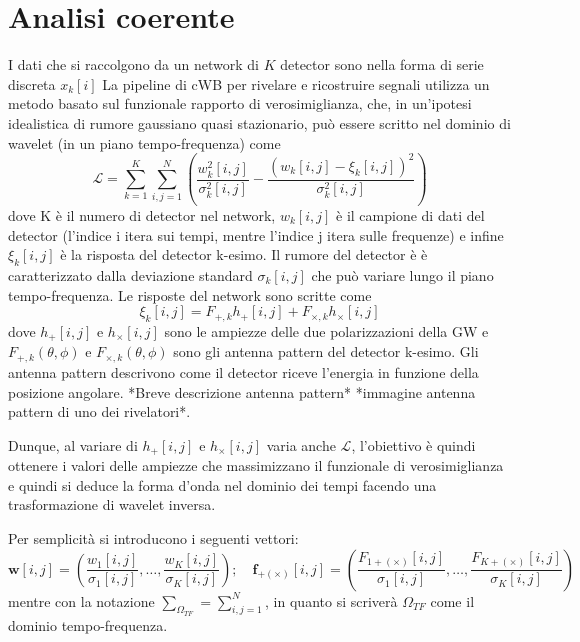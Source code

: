 \section{Analisi coerente}
\label{section:coherent_analysis}
I dati che si raccolgono da un network di $K$ detector sono nella forma di serie discreta $x_k[i]$
La pipeline di cWB per rivelare e ricostruire segnali utilizza un metodo basato sul funzionale rapporto di verosimiglianza, che, in un'ipotesi idealistica di rumore gaussiano quasi stazionario, può essere scritto nel dominio di wavelet (in un piano tempo-frequenza) come
\begin{equation}
	\mathcal{L} = \sum_{k=1}^{K}\sum_{i,j=1}^{N}\left(\frac{w_k^2[i,j]}{\sigma_k^2[i,j]} - \frac{(w_k[i,j]-\xi_k[i,j])^2}{\sigma_k^2[i,j]}  \right)
	\label{eqn:Likelihood}
\end{equation}
dove K è il numero di detector nel network, $w_k[i,j]$ è il campione di dati del detector (l'indice i itera sui tempi, mentre l'indice j itera sulle frequenze) e infine $\xi_k[i,j]$ è la risposta del detector k-esimo.
Il rumore del detector è è caratterizzato dalla deviazione standard $\sigma_k[i,j]$ che può variare lungo il piano tempo-frequenza.
Le risposte del network sono scritte come
\begin{equation}
	\xi_k[i,j] = F_{+,k}h_+[i,j] + F_{\times,k}h_\times[i,j]
	\label{eqn:detector_response}
\end{equation}
dove $h_{+}[i,j]$ e $h_{\times}[i,j]$ sono le ampiezze delle due polarizzazioni della GW e $F_{+,k}(\theta,\phi)$ e $F_{\times,k}(\theta,\phi)$ sono gli antenna pattern del detector k-esimo\cite{Klimenko_2008}. Gli antenna pattern descrivono come il detector riceve l'energia in funzione della posizione angolare. *Breve descrizione antenna pattern* *immagine antenna pattern di uno dei rivelatori*\cite{Schutz_2011}.

Dunque, al variare di $h_{+}[i,j]$ e $h_{\times}[i,j]$ varia anche $\mathcal{L}$, l'obiettivo è quindi ottenere i valori delle ampiezze che massimizzano il funzionale di verosimiglianza e quindi si deduce la forma d'onda nel dominio dei tempi facendo una trasformazione di wavelet inversa.%

Per semplicità si introducono i seguenti vettori:
\[
	\textbf{w}[i,j] = \left(\frac{w_1[i,j]}{\sigma_1[i,j]},\dots, \frac{w_K[i,j]}{\sigma_K[i,j]} \right) ;
	\quad
	\textbf{f}_{+(\times)}[i,j] = \left(\frac{F_{1+(\times)}[i,j]}{\sigma_1[i,j]},\dots, \frac{F_{K+(\times)}[i,j]}{\sigma_K[i,j]} \right) 
\]
mentre con la notazione $\sum_{\Omega_{TF}} = \sum_{i,j=1}^N$, in quanto si scriverà $\Omega_{TF}$ come il dominio tempo-frequenza. 

